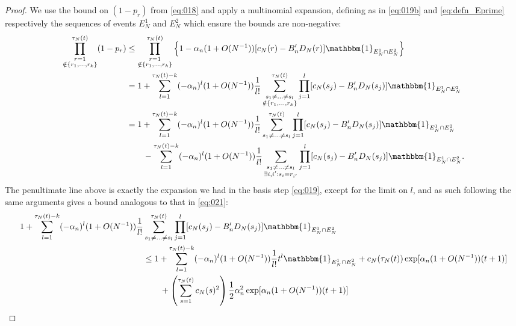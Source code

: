 \documentclass{article}
\newcommand{\1}[1]{\mathbbm{1}_{#1}}
\begin{document}
\begin{proof}
We use the bound on $(1-p_r)$ from \eqref{eq:018} and apply a multinomial expansion, defining as in \eqref{eq:019b} and \eqref{eq:defn_Eprime} respectively the sequences of events $E_N^1$ and $E_N^2$ which ensure the bounds are non-negative:
\begin{align}
\prod_{\substack{r=1 \\ \notin \{r_1,\dots,r_k\} }}^{\tau_N(t)} (1-p_r)
&\leq \prod_{\substack{r=1 \\ \notin \{r_1,\dots,r_k\} }}^{\tau_N(t)} 
        \left\{ 1 - \alpha_n  (1+O(N^{-1})) [ c_N(r) - B_n^\prime D_N(r) ] 
        \1{E_N^1 \cap E_N^2} \right\} \notag\\
&= 1 + \sum_{l=1}^{\tau_N(t) -k}
        (-\alpha_n)^l (1+O(N^{-1})) \frac{1}{l!}
        \sum_{\substack{s_1\neq\dots\neq s_l \\ \notin \{r_1,\dots,r_k\} }}
        ^{\tau_N(t)}
        \prod_{j=1}^l [ c_N(s_j) - B_n^\prime D_N(s_j) ]
        \1{E_N^1 \cap E_N^2} \notag\\
&= 1 + \sum_{l=1}^{\tau_N(t) -k}
        (-\alpha_n)^l (1+O(N^{-1})) \frac{1}{l!}
        \sum_{\substack{s_1\neq\dots\neq s_l }}^{\tau_N(t)}
        \prod_{j=1}^l [ c_N(s_j) - B_n^\prime D_N(s_j) ] \1{E_N^1 \cap E_N^2} \notag\\
    &\qquad- \sum_{l=1}^{\tau_N(t) -k}
        (-\alpha_n)^l (1+O(N^{-1})) \frac{1}{l!}
        \sum_{\substack{s_1\neq\dots\neq s_l \\ \exists i,i^\prime 
        : s_i=r_{i^\prime} }}
        \prod_{j=1}^l [ c_N(s_j) - B_n^\prime D_N(s_j) ]
        \1{E_N^1 \cap E_N^2} . \label{eq:031}
\end{align}
The penultimate line above is exactly the expansion we had in the basis step \eqref{eq:019}, except for the limit on $l$, and as such following the same arguments gives a bound analogous to that in \eqref{eq:021}:
\begin{align}
1 + \sum_{l=1}^{\tau_N(t) -k}
        (-\alpha_n)^l (1+O(N^{-1})) \frac{1}{l!}
        &\sum_{\substack{s_1\neq\dots\neq s_l }}^{\tau_N(t)}
        \prod_{j=1}^l [ c_N(s_j) - B_n^\prime D_N(s_j) ] \1{E_N^1 \cap E_N^2} \notag\\
&\leq 1+ \sum_{l=1}^{\tau_N(t) -k} (-\alpha_n)^l (1+O(N^{-1})) \frac{1}{l!} t^l
        \1{E_N^1 \cap E_N^2}
        + c_N(\tau_N(t)) \exp[ \alpha_n (1+O(N^{-1})) (t+1) ] \notag\\
    &\qquad+ \left( \sum_{s=1}^{\tau_N(t)} c_N(s)^2 \right)
        \frac{1}{2} \alpha_n^2 \exp[ \alpha_n (1+O(N^{-1})) (t+1) ] \notag\\

\end{align}
\end{proof}
\end{document}
